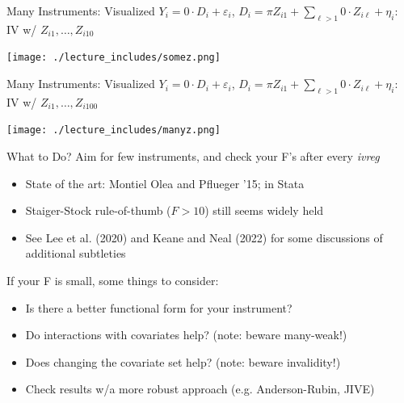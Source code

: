 \documentclass{beamer}
\begin{document}
\begin{frame}{Many Instruments: Visualized}
\vspace{-0.2cm}
$Y_i=0\cdot D_i + \varepsilon_i$, $D_i=\pi Z_{i1}+\sum_{\ell>1} 0\cdot Z_{i\ell}+\eta_i$: IV w/ $Z_{i1},\dots,Z_{i10}$
\begin{center}
\texttt{[image: ./lecture\_includes/somez.png]}
\end{center}

\end{frame}

\begin{frame}{Many Instruments: Visualized}
\vspace{-0.2cm}
$Y_i=0\cdot D_i + \varepsilon_i$, $D_i=\pi Z_{i1}+\sum_{\ell>1} 0\cdot Z_{i\ell}+\eta_i$: IV w/ $Z_{i1},\dots,Z_{i100}$
\begin{center}
\texttt{[image: ./lecture\_includes/manyz.png]}
\end{center}

\end{frame}

\begin{frame}{What to Do?}
\vspace{-0.2cm}
Aim for few instruments, and check your F's after every \emph{ivreg}\smallskip
\begin{itemize}
\item State of the art: Montiel Olea and Pflueger '15;  in Stata\smallskip
\item Staiger-Stock rule-of-thumb ($F>10$) still seems widely held\smallskip
\item See Lee et al. (2020) and Keane and Neal (2022) for some discussions of additional subtleties
\end{itemize}
\medskip\pause{}

If your F is small, some things to consider:\smallskip
\begin{itemize}
\item Is there a better functional form for your instrument?\smallskip
\item Do interactions with covariates help? (note: beware many-weak!)\smallskip
\item Does changing the covariate set help? (note: beware invalidity!)\smallskip
\item Check results w/a more robust approach (e.g. Anderson-Rubin, JIVE)
\end{itemize}


\end{frame}
\end{document}
